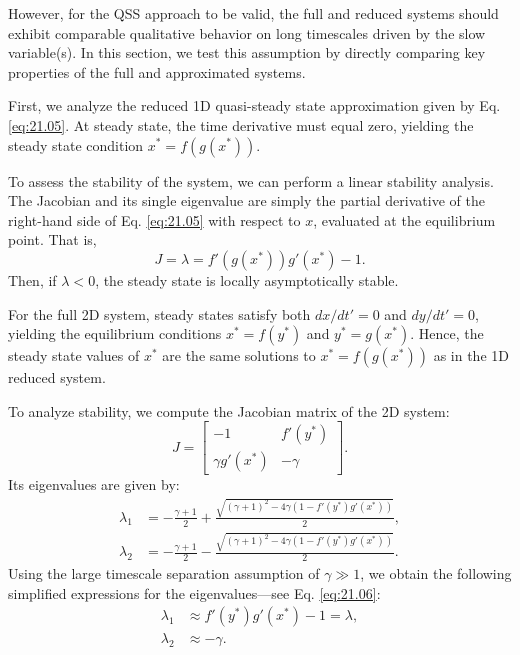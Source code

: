 However, for the QSS approach to be valid, the full and reduced systems should exhibit comparable qualitative behavior on long timescales driven by the slow variable(s). In this section, we test this assumption by directly comparing key properties of the full and approximated systems.

First, we analyze the reduced 1D quasi-steady state approximation given by Eq. \eqref{eq:21.05}. At steady state, the time derivative must equal zero, yielding the steady state condition $x^* = f(g(x^*))$.

To assess the stability of the system, we can perform a linear stability analysis. The Jacobian and its single eigenvalue are simply the partial derivative of the right-hand side of Eq. \eqref{eq:21.05} with respect to $x$, evaluated at the equilibrium point. That is, 
\begin{equation}
    J=\lambda=f'(g(x^*)) g'(x^*)-1. \label{eq:21.06}
\end{equation} 
Then, if $\lambda<0$, the steady state is locally asymptotically stable.

For the full 2D system, steady states satisfy both $dx/dt' = 0$ and $dy/dt' = 0$, yielding the equilibrium conditions $x^* = f(y^*)$ and $y^* = g(x^*)$. Hence, the steady state values of $x^*$ are the same solutions to $x^* = f(g(x^*))$ as in the 1D reduced system.

To analyze stability, we compute the Jacobian matrix of the 2D system:
\begin{equation*}
J = \begin{bmatrix}
-1 & f'(y^*) \\
\gamma g'(x^*) & -\gamma
\end{bmatrix}.
\end{equation*}
Its eigenvalues are given by:
\begin{align*}
\lambda_1 &= - \frac{\gamma + 1}{2} + \frac{\sqrt{(\gamma + 1)^2 - 4 \gamma (1 - f'(y^*)g'(x^*))}}{2},\\ 
\lambda_2 &= - \frac{\gamma + 1}{2} - \frac{\sqrt{(\gamma + 1)^2 - 4 \gamma (1 - f'(y^*)g'(x^*))}}{2}. 
\end{align*}
Using the large timescale separation assumption of $\gamma \gg 1$, we obtain the following simplified expressions for the eigenvalues---see Eq. \eqref{eq:21.06}:
\begin{align}
	\lambda_1 & \approx f'(y^*)g'(x^*) - 1 = \lambda, \label{eq:21.07} \\
	\lambda_2 & \approx -\gamma.  \label{eq:21.08}
\end{align}

